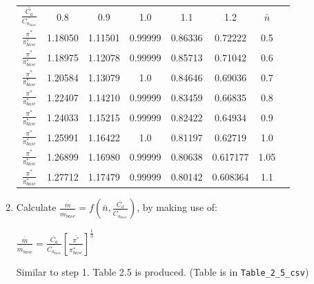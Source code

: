 \documentclass[12pt,english]{article}
\begin{document}
\begin{enumerate}
\begin{center}
        \begin{tabular}{c c c c c c c c }
            $\frac{\bar{C_{a}}}{\bar{C_{a_{base}}}}$ & 0.8 & 0.9 & 1.0 & 1.1 & 1.2 & $\bar{n}$ \\
            $\frac{\pi^{*}}{\pi^{*}_{base}}$ & 1.18050 & 1.11501 & 0.99999 & 0.86336 & 0.72222 & 0.5 \\
            $\frac{\pi^{*}}{\pi^{*}_{base}}$ & 1.18975 & 1.12078 & 0.99999 & 0.85713 & 0.71042 & 0.6 \\
            $\frac{\pi^{*}}{\pi^{*}_{base}}$ & 1.20584 & 1.13079 & 1.0 & 0.84646 & 0.69036 & 0.7 \\
            $\frac{\pi^{*}}{\pi^{*}_{base}}$ & 1.22407 & 1.14210 & 0.99999 & 0.83459 & 0.66835 & 0.8 \\
            $\frac{\pi^{*}}{\pi^{*}_{base}}$ & 1.24033 & 1.15215 & 0.99999 &  0.82422 & 0.64934 & 0.9 \\
            $\frac{\pi^{*}}{\pi^{*}_{base}}$ & 1.25991 & 1.16422 & 1.0 & 0.81197 & 0.62719 & 1.0 \\
            $\frac{\pi^{*}}{\pi^{*}_{base}}$ & 1.26899 & 1.16980 & 0.99999 & 0.80638 & 0.617177 & 1.05 \\
            $\frac{\pi^{*}}{\pi^{*}_{base}}$ & 1.27712 & 1.17479 & 0.99999 & 0.80142 & 0.608364 & 1.1 \\
        \end{tabular}
    \end{center}

    \item Calculate $\frac{\bar{\dot{m}}}{\bar{\dot{m_{base}}}} = f (\bar{n}, \frac{\bar{C_{a}}}{\bar{C_{a_{base}}}})$, by making use of:
    
    \begin{center}
        $\frac{\bar{\dot{m}}}{\bar{\dot{m_{base}}}} = \frac{\bar{C_{a}}}{\bar{C_{a_{base}}}} \left[ \frac{\bar{\pi^{*}}}{\bar{\pi^{*}_{base}}} \right] ^{\frac{1}{3}}$
    \end{center}

    Similar to step 1. Table 2.5 is produced. (Table is in \verb|Table_2_5_csv|)


\end{enumerate}
\end{document}
